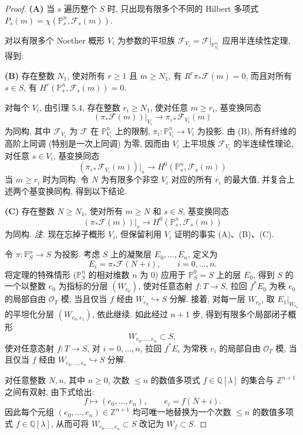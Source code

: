 \begin{proof}
\textbf{(A)} 当 $s$ 遍历整个 $S$ 时, 只出现有限多个不同的 Hilbert 多项式 $P_s(m)=\chi(\mathbb P^n_s,\mathcal F_s(m))$.

对以有限多个 Noether 概形 $V_i$ 为参数的平坦族 $\mathcal F_{V_i}=\mathcal F|_{\mathbb P^n_{V_i}}$ 应用半连续性定理, 得到:

\textbf{(B)} 存在整数 $N_1$, 使对所有 $r\geq1$ 且 $m\geq N_1$, 有 $R^r\pi_*\mathcal F(m)=0$, 而且对所有 $s\in S$, 有 $H^r(\mathbb P^n_s,\mathcal F_s(m))=0$.

对每个 $V_i$, 由引理 5.4, 存在整数 $r_i\geq N_1$, 使对任意 $m\geq r_i$, 基变换同态
\[
 (\pi_*\mathcal F(m))|_{V_i}\longrightarrow\pi_{i*}\mathcal F_{V_i}(m)
\]
为同构, 其中 $\mathcal F_{V_i}$ 为 $\mathcal F$ 在 $\mathbb P^n_{V_i}$ 上的限制, $\pi_i:\mathbb P^n_{V_i}\to V_i$ 为投影. 由 (B), 所有纤维的高阶上同调 (特别是一次上同调) 为零, 因而由 $V_i$ 上平坦族 $\mathcal F_{V_i}$ 的半连续性理论, 对任意 $s\in V_i$, 基变换同态
\[
 (\pi_{i*}\mathcal F_{V_i}(m))|_s\longrightarrow H^0(\mathbb P^n_s,\mathcal F_s(m))
\]
当 $m\geq r_i$ 时为同构. 令 $N$ 为有限多个非空 $V_i$ 对应的所有 $r_i$ 的最大值, 并复合上述两个基变换同构, 得到以下结论.

\textbf{(C)} 存在整数 $N\geq N_1$, 使对所有 $m\geq N$ 和 $s\in S$, 基变换同态
\[
 (\pi_*\mathcal F(m))|_s\longrightarrow H^0(\mathbb P^n_s,\mathcal F_s(m))
\]
为同构.
\emph{注.} 现在忘掉子概形 $V_i$, 但保留利用 $V_i$ 证明的事实 (A)、(B)、(C).

令 $\pi:\mathbb P^n_S\to S$ 为投影. 考虑 $S$ 上的凝聚层 $E_0,\ldots,E_n$, 定义为
\[
 E_i=\pi_*\mathcal F(N+i),\qquad i=0,\ldots,n.
\]
将定理的特殊情形 ($\mathbb P^n_S$ 的相对维数 $n$ 为 $0$) 应用于 $\mathbb P^0_S=S$ 上的层 $E_0$, 得到 $S$ 的一个以整数 $e_0$ 为指标的分层 $(W_{e_0})$, 使对任意态射 $f:T\to S$, 拉回 $f^*E_0$ 为秩 $e_0$ 的局部自由 $\mathcal O_T$ 模, 当且仅当 $f$ 经由 $W_{e_0}\hookrightarrow S$ 分解. 接着, 对每一层 $W_{e_0}$, 取 $E_1|_{W_{e_0}}$ 的平坦化分层 $(W_{e_0,e_1})$, 依此继续. 如此经过 $n+1$ 步, 得到有限多个局部闭子概形
\[
 W_{e_0,\ldots,e_n}\subset S,
\]
使对任意态射 $f:T\to S$, 对 $i=0,\ldots,n$, 拉回 $f^*E_i$ 为常秩 $e_i$ 的局部自由 $\mathcal O_T$ 模, 当且仅当 $f$ 经由 $W_{e_0,\ldots,e_n}\hookrightarrow S$ 分解.

对任意整数 $N,n$, 其中 $n\geq0$, 次数 $\leq n$ 的数值多项式 $f\in\mathbb Q[\lambda]$ 的集合与 $\mathbb Z^{n+1}$ 之间有双射, 由下式给出:
\[
 f\longmapsto(e_0,\ldots,e_n),\qquad e_i=f(N+i).
\]
因此每个元组 $(e_0,\ldots,e_n)\in\mathbb Z^{n+1}$ 均可唯一地替换为一个次数 $\leq n$ 的数值多项式 $f\in\mathbb Q[\lambda]$, 从而可将 $W_{e_0,\ldots,e_n}\subset S$ 改记为 $W_f\subset S$.


\end{proof}
